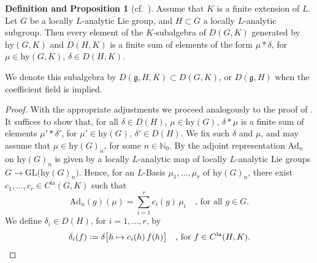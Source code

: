 \documentclass[a4paper, reqno, 10pt]{amsart}
\theoremstyle{definition}
\newtheorem{definitionproposition}[theorem]{Definition and Proposition}
\numberwithin{equation}{section}
\newcommand{\Ad}{{\mathrm{Ad}}}
\renewcommand{\dim}{{\mathrm{dim}}}
\newcommand{\defeq}{\vcentcolon=}
\newcommand{\End}{{\mathrm{End}}}
\newcommand{\GL}{{\mathrm{GL}}}
\newcommand{\hy}{{\mathrm{hy}}}
\newcommand{\la}{{\mathrm{la}}}
\newcommand{\mto}{\mapsto}
\newcommand{\ra}{\rightarrow}
\newcommand{\BN}{{\mathbb {N}}}
\newcommand{\Fg}{{\mathfrak {g}}}
\begin{document}
\begin{definitionproposition}[{cf.\ \cite[Prop.\ 3.5]{OrlikStrauch15JordanHoelderSerLocAnRep}}]\label{Prop 1 - Description of product of hyperalgebra and distribution algebra of subgroup}
	Assume that $K$ is a finite extension of $L$.
	Let $G$ be a locally $L$-analytic Lie group, and $H\subset G$ a locally $L$-analytic subgroup.
	Then every element of the $K$-subalgebra of $D(G,K)$ generated by $\hy(G,K)$ and $D(H,K)$ is a finite sum of elements of the form $\mu \ast \delta$, for $\mu \in \hy(G,K)$, $\delta \in D(H,K)$.
	
	We denote this subalgebra by $D(\Fg,H,K) \subset D(G,K)$, or $D(\Fg,H)$ when the coefficient field is implied.
\end{definitionproposition}
\begin{proof}
	With the appropriate adjustments we proceed analogously to the proof of \cite[Prop.\ 3.5]{OrlikStrauch15JordanHoelderSerLocAnRep}.
	It suffices to show that, for all $\delta\in D(H)$, $\mu \in \hy(G)$, $\delta \ast \mu$ is a finite sum of elements $\mu'\ast \delta'$, for $\mu'\in \hy(G)$, $\delta' \in D(H)$.
	We fix such $\delta$ and $\mu$, and may assume that $\mu \in \hy(G)_n$, for some $n\in \BN_0$.
	By  the adjoint representation $\Ad_n$ on $\hy(G)_n$ is given by a locally $L$-analytic map of locally $L$-analytic Lie groups $G \ra \GL\big(\hy(G)_n \big)$.
	Hence, for an $L$-Basis $\mu_1,\ldots,\mu_r$ of $\hy(G)_n$, there exist $c_1,\ldots,c_r \in C^\la(G,K)$ such that
	\begin{equation*}
		\Ad_n(g)(\mu) = \sum_{i=1}^r c_i(g) \, \mu_i \quad\text{, for all $g\in G$.}
	\end{equation*}
	We define $\delta_i \in D(H)$, for $i=1,\ldots,r$, by
	\[\delta_i(f) \defeq \delta\big[ h \mto c_i(h) \, f(h) \big] \quad \text{, for $f\in C^\la(H,K)$.} \]

\end{proof}
\end{document}
